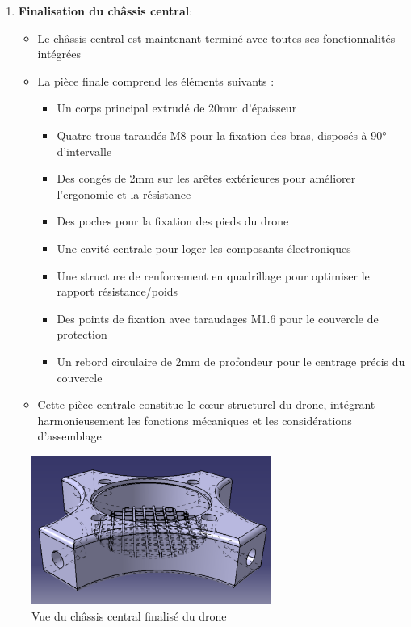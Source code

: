 \documentclass[a4paper,12pt]{report}
\begin{document}
\begin{enumerate}
    \item \textbf{Finalisation du châssis central}:
    \begin{itemize}
        \item Le châssis central est maintenant terminé avec toutes ses fonctionnalités intégrées
        \item La pièce finale comprend les éléments suivants :
        \begin{itemize}
            \item Un corps principal extrudé de 20mm d'épaisseur
            \item Quatre trous taraudés M8 pour la fixation des bras, disposés à 90° d'intervalle
            \item Des congés de 2mm sur les arêtes extérieures pour améliorer l'ergonomie et la résistance
            \item Des poches pour la fixation des pieds du drone
            \item Une cavité centrale pour loger les composants électroniques
            \item Une structure de renforcement en quadrillage pour optimiser le rapport résistance/poids
            \item Des points de fixation avec taraudages M1.6 pour le couvercle de protection
            \item Un rebord circulaire de 2mm de profondeur pour le centrage précis du couvercle
        \end{itemize}
        \item Cette pièce centrale constitue le cœur structurel du drone, intégrant harmonieusement les fonctions mécaniques et les considérations d'assemblage
    \end{itemize}
\end{enumerate}

\begin{figure}[H]
    \centering
    \includegraphics[width=0.7\textwidth]{images/chassis_central_final.png}
    \caption{Vue du châssis central finalisé du drone}
    \label{fig:chassis_final}
\end{figure}
\end{document}
